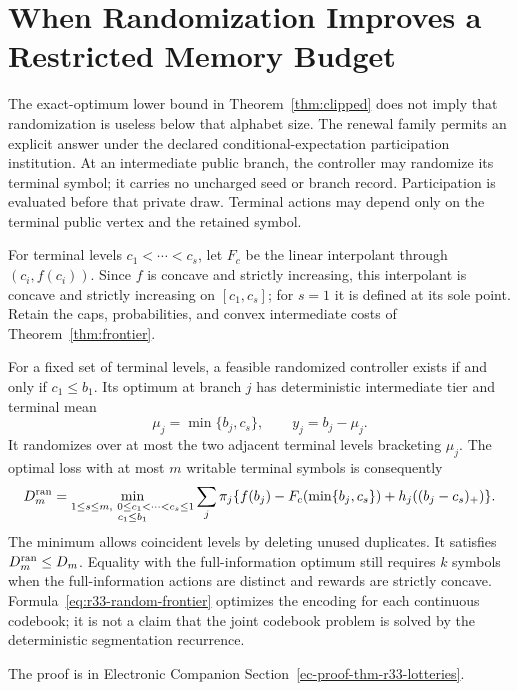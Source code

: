 \section{When Randomization Improves a Restricted Memory Budget}\label{sec:r33-random}
The exact-optimum lower bound in Theorem~\ref{thm:clipped} does not imply that randomization is useless below that alphabet size. The renewal family permits an explicit answer under the declared conditional-expectation participation institution. At an intermediate public branch, the controller may randomize its terminal symbol; it carries no uncharged seed or branch record. Participation is evaluated before that private draw. Terminal actions may depend only on the terminal public vertex and the retained symbol.

For terminal levels $c_1<\cdots<c_s$, let $F_c$ be the linear interpolant through $(c_i,f(c_i))$. Since $f$ is concave and strictly increasing, this interpolant is concave and strictly increasing on $[c_1,c_s]$; for $s=1$ it is defined at its sole point. Retain the caps, probabilities, and convex intermediate costs of Theorem~\ref{thm:frontier}.

\begin{theorem}\label{thm:r33-lotteries}
For a fixed set of terminal levels, a feasible randomized controller exists if and only if $c_1\leq b_1$. Its optimum at branch $j$ has deterministic intermediate tier and terminal mean
\[
 \mu_j=\min\{b_j,c_s\},\qquad y_j=b_j-\mu_j.
\]
It randomizes over at most the two adjacent terminal levels bracketing $\mu_j$. The optimal loss with at most $m$ writable terminal symbols is consequently
\begin{equation}\label{eq:r33-random-frontier}
 D_m^{\rm ran}=\min_{\substack{1\leq s\leq m,\ 0\leq c_1<\cdots<c_s\leq1\\c_1\leq b_1}}
 \sum_j\pi_j\{f(b_j)-F_c(\min\{b_j,c_s\})+h_j((b_j-c_s)_+)\}.
\end{equation}
The minimum allows coincident levels by deleting unused duplicates. It satisfies $D_m^{\rm ran}\leq D_m$. Equality with the full-information optimum still requires $k$ symbols when the full-information actions are distinct and rewards are strictly concave. Formula~\eqref{eq:r33-random-frontier} optimizes the encoding for each continuous codebook; it is not a claim that the joint codebook problem is solved by the deterministic segmentation recurrence.
\end{theorem}
\noindent The proof is in Electronic Companion Section~\ref{ec-proof-thm-r33-lotteries}.


